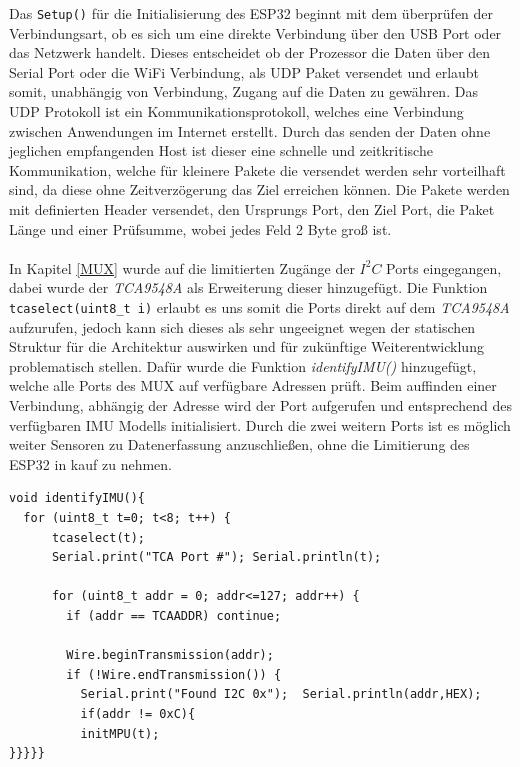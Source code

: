 Das \lstinline{Setup()} für die Initialisierung des ESP32 beginnt mit dem überprüfen der Verbindungsart, ob es sich um eine direkte Verbindung über den USB Port oder das Netzwerk handelt. Dieses entscheidet ob der Prozessor die Daten über den Serial Port oder die WiFi Verbindung, als UDP Paket versendet und erlaubt somit, unabhängig von Verbindung, Zugang auf die Daten zu gewähren. Das UDP Protokoll ist ein Kommunikationsprotokoll, welches eine Verbindung zwischen Anwendungen im Internet erstellt.
Durch das senden der Daten ohne jeglichen empfangenden Host ist dieser eine schnelle und zeitkritische Kommunikation, welche für kleinere Pakete die versendet werden sehr vorteilhaft sind, da diese ohne Zeitverzögerung das Ziel erreichen können. Die Pakete werden mit definierten Header versendet, den Ursprungs Port, den Ziel Port, die Paket Länge und einer Prüfsumme, wobei jedes Feld 2 Byte groß ist. 
\\
\\
In Kapitel \ref{MUX} wurde auf die limitierten Zugänge der $I^{2}C$ Ports eingegangen, dabei wurde der \textit{TCA9548A} als Erweiterung dieser hinzugefügt. Die Funktion \lstinline{tcaselect(uint8_t i)} erlaubt es uns somit die Ports direkt auf dem \textit{TCA9548A} aufzurufen, jedoch kann sich dieses als sehr ungeeignet wegen der statischen Struktur für die Architektur auswirken und für zukünftige Weiterentwicklung problematisch stellen.
Dafür wurde die Funktion \textit{identifyIMU()} hinzugefügt, welche alle Ports des MUX auf verfügbare Adressen prüft. Beim auffinden einer Verbindung, abhängig der Adresse wird der Port aufgerufen und entsprechend des verfügbaren IMU Modells initialisiert. Durch die zwei weitern Ports ist es möglich weiter Sensoren zu Datenerfassung anzuschließen, ohne die Limitierung des ESP32 in kauf zu nehmen.
\begin{lstlisting}
void identifyIMU(){
  for (uint8_t t=0; t<8; t++) {
      tcaselect(t);
      Serial.print("TCA Port #"); Serial.println(t);

      for (uint8_t addr = 0; addr<=127; addr++) {
        if (addr == TCAADDR) continue;

        Wire.beginTransmission(addr);
        if (!Wire.endTransmission()) {
          Serial.print("Found I2C 0x");  Serial.println(addr,HEX);
          if(addr != 0xC){
          initMPU(t);
}}}}}
\end{lstlisting}


